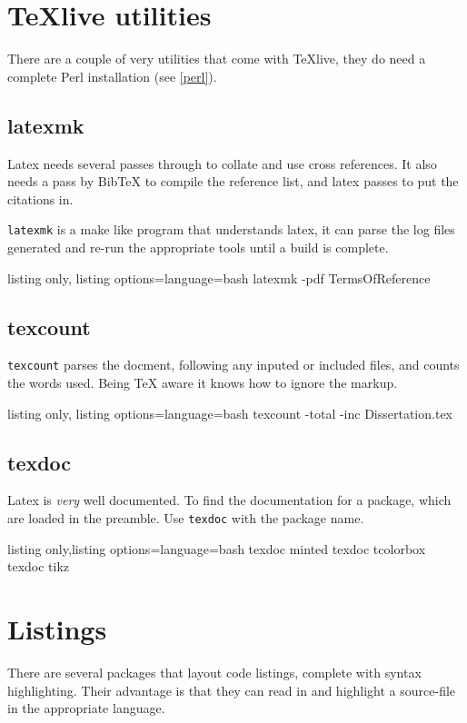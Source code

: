 \section{TeXlive utilities}
There are a couple of very utilities that come with TeXlive, they do need a complete Perl installation (see \ref{perl}).

\subsection{latexmk}\label{latexmk}
Latex needs several passes through to collate and use cross references.  It also needs a pass by BibTeX to compile the reference list, and latex passes to put the citations in.

\texttt{latexmk} is a make like program that understands latex, it can parse the log files generated and re-run the appropriate tools until a build is complete.
\begin{tcblisting}{listing only, listing options={language=bash}}
    latexmk -pdf TermsOfReference
\end{tcblisting}

\subsection{texcount}\label{texcount}
\texttt{texcount} parses the docment, following any inputed or included files, and counts the words used.  Being TeX aware it knows how to ignore the markup.
\begin{tcblisting}{listing only, listing options={language=bash}}
    texcount -total -inc Dissertation.tex
\end{tcblisting}

\subsection{texdoc}
Latex is \emph{very} well documented.  To find the documentation for a package, which are loaded in the preamble.  Use \texttt{texdoc} with the package name.
\begin{tcblisting}{listing only,listing options={language=bash}}
    texdoc minted
    texdoc tcolorbox
    texdoc tikz
\end{tcblisting}

\section{Listings}
There are several packages that layout code listings, complete with syntax highlighting.  Their advantage is that they can read in and highlight a source-file in the appropriate language.


